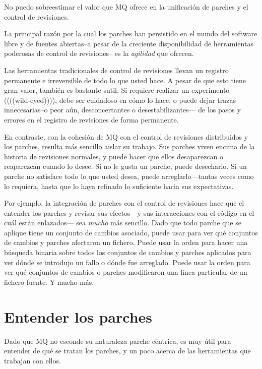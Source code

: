 No puedo sobreestimar el valor que MQ ofrece en la unificación de
parches y el control de revisiones.

La principal razón por la cual los parches han persistido en el mundo
del software libre y de fuentes abiertas--a pesar de la creciente
disponibilidad de herramientas poderosas de control de revisiones-- es
la \emph{agilidad} que ofrecen.

Las herramientas tradicionales de control de revisiones llevan un
registro permanente e irreversible de todo lo que usted hace.  A pesar
de que esto tiene gran valor, también es bastante sutil.  Si requiere
realizar un experimento ((((wild-eyed)))), debe ser cuidadoso en cómo
lo hace, o puede dejar trazas innecesarias--o peor aún,
desconcertantes o desestabilizantes--- de los pasos y errores en el
registro de revisiones de forma permanente.

En contraste, con la cohesión de MQ con el control de revisiones
distribuidos y los parches, resulta más sencillo aislar su trabajo.
Sus parches viven encima de la historia de revisiones normales, y
puede hacer que ellos desaparezcan o reaparezcan cuando lo desee.  Si
no le gusta un parche, puede desecharlo.  Si un parche no satisface
todo lo que usted desea, puede arreglarlo---tantas veces como lo
requiera, hasta que lo haya refinado lo suficiente hacia sus
expectativas.

Por ejemplo, la integración de parches con el control de revisiones
hace que el entender los parches y revisar sus efectos---y sus
interacciones con el código en el cuál están enlazados--- sea
\emph{mucho} más sencillo.  Dado que todo parche que se aplique tiene
un conjunto de cambios asociado, puede usar
 para ver qué conjuntos de cambios y
parches afectaron un fichero.  Puede usar la orden  para
hacer una búsqueda binaria sobre todos los conjuntos de cambios y
parches aplicados para ver dónde se introdujo un fallo o dónde fue
arreglado.  Puede usar la orden  para ver qué
conjuntos de cambios o parches modificaron una línea particular de un
fichero fuente. Y mucho más.

\section{Entender los parches}
\label{sec:mq:patch}

Dado que MQ no esconde su naturaleza parche-céntrica, es muy útil para
entender de qué se tratan los parches, y un poco acerca de las
herramientas que trabajan con ellos.

